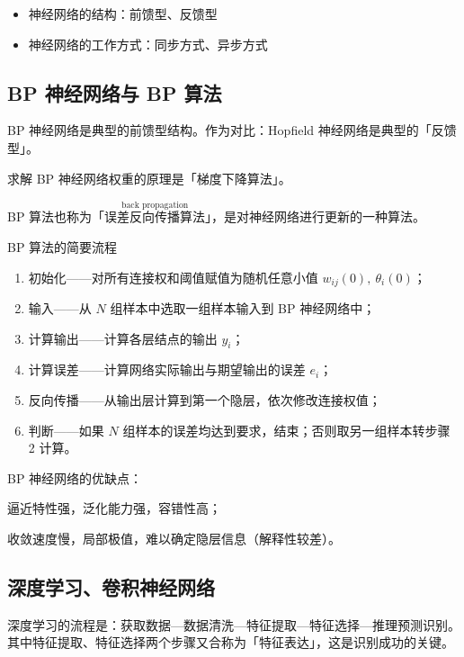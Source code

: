 \documentclass[UTF8]{ctexart}
\newcommand\Emph[1]{\colorbox{green!10}{\textcolor{green!30!black}{#1}}}
\begin{document}
\begin{itemize}[itemsep=0pt,parsep=0pt]
  \item 神经网络的结构：前馈型、反馈型
  \item 神经网络的工作方式：同步方式、异步方式
\end{itemize}

\subsection{BP 神经网络与 BP 算法}
BP 神经网络是典型的\Emph{前馈型}结构。作为对比：Hopfield 神经网络是典型的「反馈型」。

求解 BP 神经网络权重的原理是「梯度下降算法」。

BP 算法也称为「$\stackrel{\text{back propagation}}{\text{误差反向传播算法}}$」，是对神经网络进行更新的一种算法。

\begin{process}{BP 算法的简要流程}
\begin{enumerate}[itemsep=0pt,parsep=0pt]
  \item 初始化——对所有连接权和阈值赋值为随机任意小值 $w_{ij}(0),\ \theta_i(0)$；
  \item 输入——从 $N$ 组样本中选取一组样本输入到 BP 神经网络中；
  \item 计算输出——计算各层结点的输出 $y_i$；
  \item 计算误差——计算网络实际输出与期望输出的误差 $e_i$；
  \item 反向传播——从输出层计算到第一个隐层，依次修改连接权值；
  \item 判断——如果 $N$ 组样本的误差均达到要求，结束；否则取另一组样本转步骤 2 计算。
\end{enumerate}
\end{process}

BP 神经网络的优缺点：
\begin{description}[itemsep=0pt,parsep=0pt]
  \item[优点] 逼近特性强，泛化能力强，容错性高；
  \item[缺点] 收敛速度慢，局部极值，难以确定隐层信息（解释性较差）。
\end{description}

\subsection{深度学习、卷积神经网络}
深度学习的流程是：获取数据—数据清洗—特征提取—特征选择—推理预测识别。其中特征提取、特征选择两个步骤又合称为「特征表达」，这是识别成功的关键。
\end{document}

